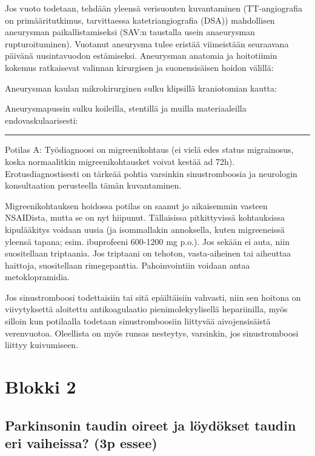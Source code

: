 \documentclass[
]{book}
\begin{document}
Jos vuoto todetaan, tehdään yleensä verisuonten kuvantaminen (TT-angiografia on primääritutkimus, tarvittaessa katetriangiografia (DSA)) mahdollisen aneurysman paikallistamiseksi (SAV:n taustalla usein anaeurysman rupturoituminen). Vuotanut aneurysma tulee eristää viimeistään seuraavana päivänä uusintavuodon estämiseksi. Aneurysman anatomia ja hoitotiimin kokemus ratkaisevat valinnan kirurgisen ja suonensisäisen hoidon välillä:

Aneurysman kaulan mikrokirurginen sulku klipsillä kraniotomian kautta:

Aneurysmapussin sulku koileilla, stentillä ja muilla materiaaleilla endovaskulaarisesti:

\begin{center}\rule{0.5\linewidth}{0.5pt}\end{center}

Potilas A: Työdiagnoosi on migreenikohtaus (ei vielä edes status migrainosus, koska normaalitkin migreenikohtausket voivat kestää ad 72h). Erotusdiagnostisesti on tärkeää pohtia varsinkin sinustromboosia ja neurologin konsultaation perusteella tämän kuvantaminen.

Migreenikohtauksen hoidossa potilas on saanut jo aikaisemmin vasteen NSAIDista, mutta se on nyt hiipunut. Tällaisissa pitkittyvissä kohtauksissa kipulääkitys voidaan uusia (ja isommallakin annoksella, kuten migreeneissä yleensä tapana; esim. ibuprofeeni 600-1200 mg p.o.). Jos sekään ei auta, niin suositellaan triptaania. Jos triptaani on tehoton, vasta-aiheinen tai aiheuttaa haittoja, suositellaan rimegepanttia. Pahoinvointiin voidaan antaa metoklopramidia.

Jos sinustromboosi todettaisiin tai sitä epäiltäisiin vahvasti, niin sen hoitona on viivytyksettä aloitettu antikoagulaatio pienimolekyylisellä hepariinilla, myös silloin kun potilaalla todetaan sinustromboosiin liittyvää aivojensisäistä verenvuotoa. Oleellista on myös runsas nesteytys, varsinkin, jos sinustromboosi liittyy kuivumiseen.

\section{Blokki 2}\label{blokki-2}

\subsection{Parkinsonin taudin oireet ja löydökset taudin eri vaiheissa? (3p essee)}\label{parkinsonin-taudin-oireet-ja-luxf6yduxf6kset-taudin-eri-vaiheissa-3p-essee}
\end{document}
